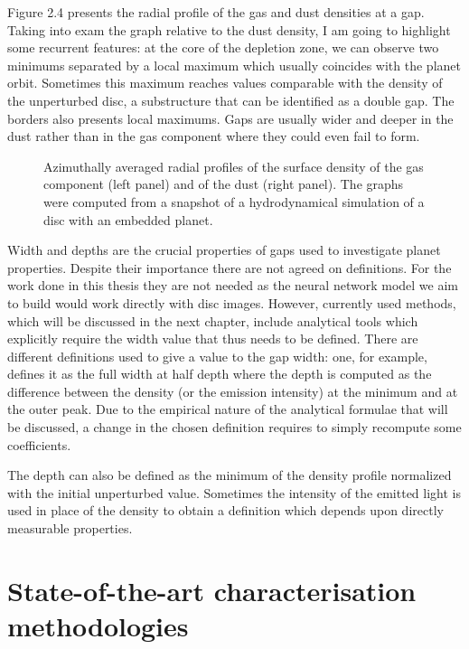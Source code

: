 \documentclass[a4paper,10pt]{report}
\begin{document}
Figure 2.4 presents the radial profile of the gas and dust densities at a gap. Taking into exam 
the graph relative to the dust density, I am going to highlight some recurrent features:
at the core of the depletion zone, we can observe two minimums separated by a local maximum which usually coincides with the planet orbit.
Sometimes this maximum reaches values comparable with the density of the unperturbed disc, a substructure that can be identified as a double gap. 
The borders also presents local maximums. Gaps are usually wider and deeper in the dust rather than in the gas component where they could even
fail to form.

\begin{figure}
    \begin{center}
        
    \end{center}
    \caption{Azimuthally averaged radial profiles of the surface density of the gas component (left panel)
    and of the dust (right panel). The graphs were computed from a snapshot of a hydrodynamical
    simulation of a disc with an embedded planet.}
\end{figure}

Width and depths are the crucial properties of gaps used to investigate planet properties. Despite their importance there are not agreed on definitions.
For the work done in this thesis they are not needed as the neural network model we aim to build would work directly with disc images.
However, currently used methods, which will be discussed in the next chapter, include analytical tools which explicitly require the width
value that thus needs to be defined.
There are different definitions used to give a value to the gap width: one, for example, defines it as the full width at half depth \cite{Long_2018} where 
the depth is computed as the difference between the density (or the emission intensity) at the minimum and at the outer peak.
Due to the empirical nature of the analytical formulae that will be discussed, a change in the chosen definition requires to simply recompute
some coefficients.                                        

The depth can also be defined as the minimum of the density profile normalized with the initial unperturbed value. Sometimes the intensity of the emitted light is used in place of the
density to obtain a definition which depends upon directly measurable properties.

\chapter{State-of-the-art characterisation methodologies}
\end{document}
